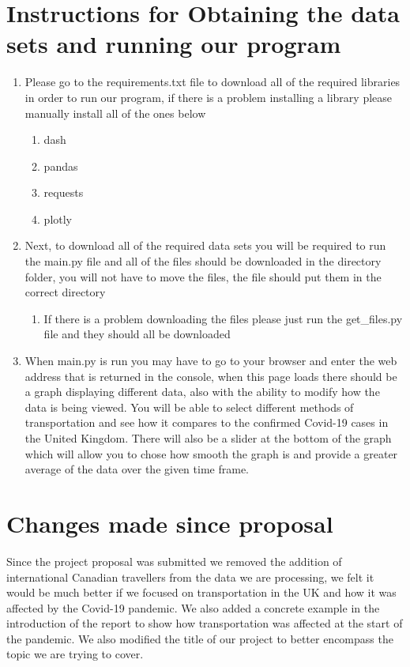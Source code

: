 \documentclass[fontsize=11pt]{article}
\begin{document}
\section*{Instructions for Obtaining the data sets and running our program}
\begin{enumerate}
    \item Please go to the requirements.txt file to download all of the required libraries in order to run our program, if there is a problem installing a library please manually install all of the ones below
    \begin{enumerate}
        \item dash
        \item pandas
        \item requests
        \item plotly
    \end{enumerate}
    \item Next, to download all of the required data sets you will be required to run the main.py file and all of the files should be downloaded in the directory folder, you will not have to move the files, the file should put them in the correct directory
    \begin{enumerate}
        \item If there is a problem downloading the files please just run the get\_files.py file and they should all be downloaded
    \end{enumerate}
    \item When main.py is run you may have to go to your browser and enter the web address that is returned in the console, when this page loads there should be a graph displaying different data, also with the ability to modify how the data is being viewed. You will be able to select different methods of transportation and see how it compares to the confirmed Covid-19 cases in the United Kingdom. There will also be a slider at the bottom of the graph which will allow you to chose how smooth the graph is and provide a greater average of the data over the given time frame.
\end{enumerate}

\section*{Changes made since proposal}
Since the project proposal was submitted we removed the addition of international Canadian travellers from the data we are processing, we felt it would be much better if we focused on transportation in the UK and how it was affected by the Covid-19 pandemic. We also added a concrete example in the introduction of the report to show how transportation was affected at the start of the pandemic. We also modified the title of our project to better encompass the topic we are trying to cover.
\end{document}
